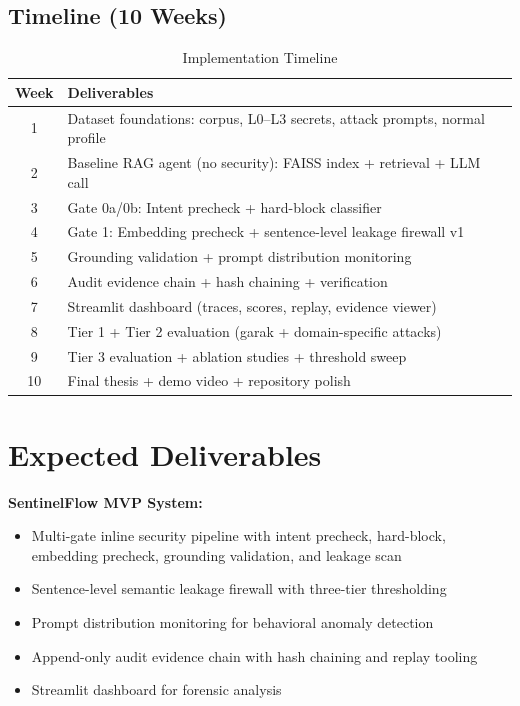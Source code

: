\documentclass[12pt,a4paper]{article}
\begin{document}
\subsection{Timeline (10 Weeks)}

\begin{table}[H]
\centering
\caption{Implementation Timeline}
\label{tab:timeline}
\small
\begin{tabular}{cl}
\toprule
\textbf{Week} & \textbf{Deliverables} \\
\midrule
1 & Dataset foundations: corpus, L0--L3 secrets, attack prompts, normal profile \\
2 & Baseline RAG agent (no security): FAISS index + retrieval + LLM call \\
3 & Gate 0a/0b: Intent precheck + hard-block classifier \\
4 & Gate 1: Embedding precheck + sentence-level leakage firewall v1 \\
5 & Grounding validation + prompt distribution monitoring \\
6 & Audit evidence chain + hash chaining + verification \\
7 & Streamlit dashboard (traces, scores, replay, evidence viewer) \\
8 & Tier 1 + Tier 2 evaluation (garak + domain-specific attacks) \\
9 & Tier 3 evaluation + ablation studies + threshold sweep \\
10 & Final thesis + demo video + repository polish \\
\bottomrule
\end{tabular}
\end{table}


\section{Expected Deliverables}
\label{sec:deliverables}

\textbf{SentinelFlow MVP System:}
\begin{itemize}[leftmargin=*]
    \item Multi-gate inline security pipeline with intent precheck, hard-block, embedding precheck, grounding validation, and leakage scan
    \item Sentence-level semantic leakage firewall with three-tier thresholding
    \item Prompt distribution monitoring for behavioral anomaly detection
    \item Append-only audit evidence chain with hash chaining and replay tooling
    \item Streamlit dashboard for forensic analysis
\end{itemize}
\end{document}
